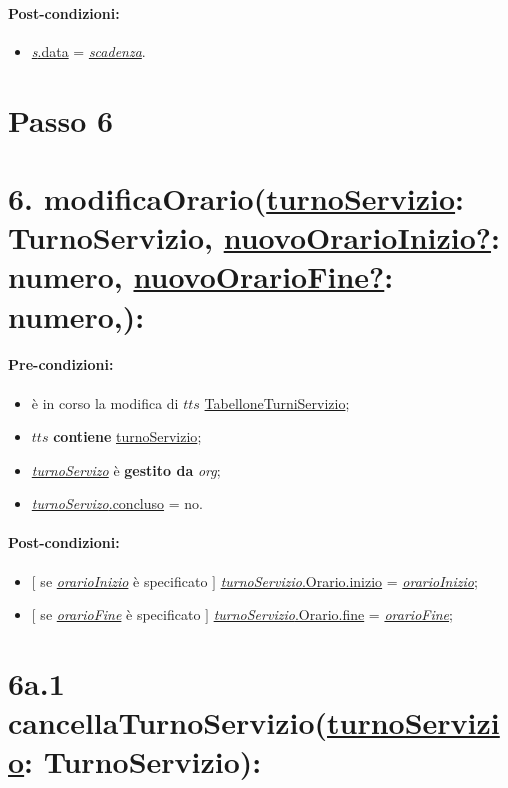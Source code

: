 \paragraph{Post-condizioni:}
\begin{itemize}
    \item \underline{\textit{s}.data} = \underline{\textit{scadenza}}.
\end{itemize}

\section{Passo 6}
\section*{6. modificaOrario(\underline{turnoServizio}: TurnoServizio, \underline{nuovoOrarioInizio?}: numero, \underline{nuovoOrarioFine?}: numero,):}

\paragraph{Pre-condizioni:}
\begin{itemize}
 \item è in corso la modifica di $tts$ \underline{TabelloneTurniServizio};
 \item $tts$ \textbf{contiene} \underline{turnoServizio};
   \item \underline{\textit{turnoServizo}} è \textbf{gestito da} {\textit{org}};
   \item \underline{\textit{turnoServizo}.concluso} = no.
\end{itemize}

\paragraph{Post-condizioni:}

\begin{itemize}
    \item $[$ se \underline{\textit{orarioInizio}} è specificato $]$ \underline{\textit{turnoServizio}.Orario.inizio} = \underline{\textit{orarioInizio}};
    \item $[$ se \underline{\textit{orarioFine}} è specificato $]$ \underline{\textit{turnoServizio}.Orario.fine} = \underline{\textit{orarioFine}};
\end{itemize}

\section*{6a.1 cancellaTurnoServizio(\underline{turnoServizio}: TurnoServizio):}

